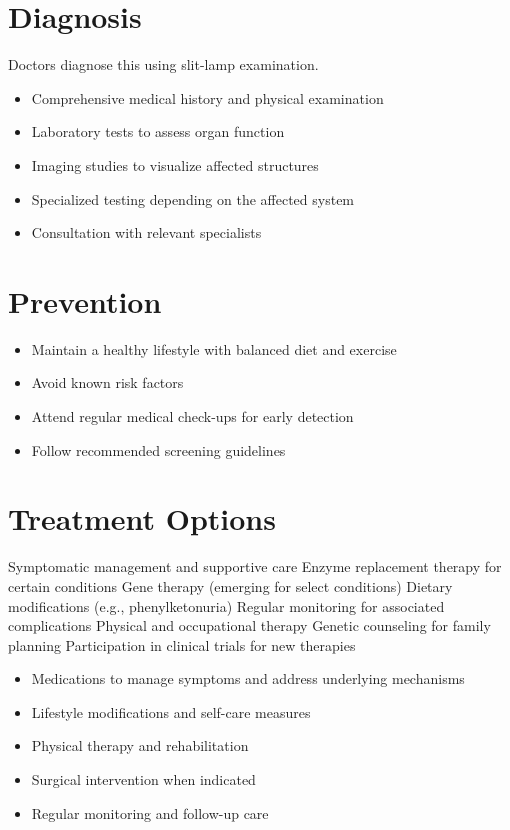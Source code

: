 \section{Diagnosis}
Doctors diagnose this using slit-lamp examination.

\begin{itemize}[noitemsep]
  \item Comprehensive medical history and physical examination
  \item Laboratory tests to assess organ function
  \item Imaging studies to visualize affected structures
  \item Specialized testing depending on the affected system
  \item Consultation with relevant specialists
\end{itemize}
\section{Prevention}
\begin{itemize}[noitemsep]
  \item Maintain a healthy lifestyle with balanced diet and exercise
  \item Avoid known risk factors
  \item Attend regular medical check-ups for early detection
  \item Follow recommended screening guidelines
\end{itemize}
\section{Treatment Options}
Symptomatic management and supportive care Enzyme replacement therapy for certain conditions Gene therapy (emerging for select conditions) Dietary modifications (e.g., phenylketonuria) Regular monitoring for associated complications Physical and occupational therapy Genetic counseling for family planning Participation in clinical trials for new therapies

\begin{itemize}[noitemsep]
  \item Medications to manage symptoms and address underlying mechanisms
  \item Lifestyle modifications and self-care measures
  \item Physical therapy and rehabilitation
  \item Surgical intervention when indicated
  \item Regular monitoring and follow-up care
\end{itemize}
